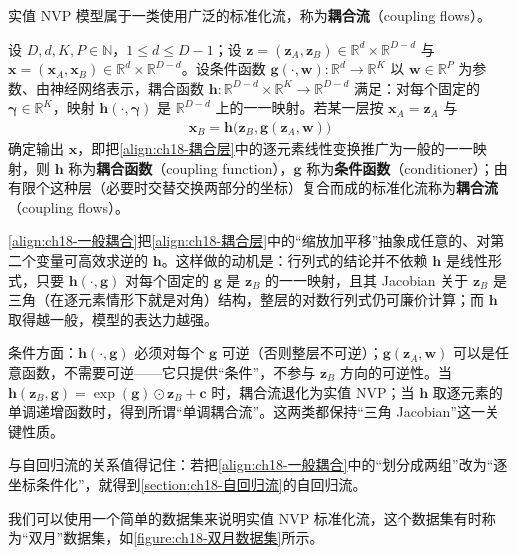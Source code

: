 \documentclass[../../main.tex]{subfiles}
\begin{document}
实值 NVP 模型属于一类使用广泛的标准化流，称为\textbf{耦合流}（coupling flows）。

\begin{definition}[耦合流]\label{definition:ch18-耦合流}
设 $D,d,K,P\in\mathbb{N}$，$1\leqslant d\leqslant D-1$；设 $\bm{z}=(\bm{z}_A,\bm{z}_B)\in\mathbb{R}^{d}\times\mathbb{R}^{D-d}$ 与 $\bm{x}=(\bm{x}_A,\bm{x}_B)\in\mathbb{R}^{d}\times\mathbb{R}^{D-d}$。设条件函数 $\bm{g}(\cdot,\bm{w}):\mathbb{R}^{d}\to\mathbb{R}^{K}$ 以 $\bm{w}\in\mathbb{R}^{P}$ 为参数、由神经网络表示，耦合函数 $\bm{h}:\mathbb{R}^{D-d}\times\mathbb{R}^{K}\to\mathbb{R}^{D-d}$ 满足：对每个固定的 $\bm{\gamma}\in\mathbb{R}^{K}$，映射 $\bm{h}(\cdot,\bm{\gamma})$ 是 $\mathbb{R}^{D-d}$ 上的一一映射。若某一层按 $\bm{x}_A=\bm{z}_A$ 与
\begin{align}
  \bm{x}_B=\bm{h}\big(\bm{z}_B,\bm{g}(\bm{z}_A,\bm{w})\big)\label{align:ch18-一般耦合}
\end{align}
确定输出 $\bm{x}$，即把\eqref{align:ch18-耦合层}中的逐元素线性变换推广为一般的一一映射，则 $\bm{h}$ 称为\textbf{耦合函数}（coupling function），$\bm{g}$ 称为\textbf{条件函数}（conditioner）；由有限个这种层（必要时交替交换两部分的坐标）复合而成的标准化流称为\textbf{耦合流}（coupling flows）。
\end{definition}

\begin{remark}
\eqref{align:ch18-一般耦合}把\eqref{align:ch18-耦合层}中的“缩放加平移”抽象成任意的、对第二个变量可高效求逆的 $\bm{h}$。这样做的动机是：行列式的结论并不依赖 $\bm{h}$ 是线性形式，只要 $\bm{h}(\cdot,\bm{g})$ 对每个固定的 $\bm{g}$ 是 $\bm{z}_B$ 的一一映射，且其 Jacobian 关于 $\bm{z}_B$ 是三角（在逐元素情形下就是对角）结构，整层的对数行列式仍可廉价计算；而 $\bm{h}$ 取得越一般，模型的表达力越强。

条件方面：$\bm{h}(\cdot,\bm{g})$ 必须对每个 $\bm{g}$ 可逆（否则整层不可逆）；$\bm{g}(\bm{z}_A,\bm{w})$ 可以是任意函数，不需要可逆——它只提供“条件”，不参与 $\bm{z}_B$ 方向的可逆性。当 $\bm{h}(\bm{z}_B,\bm{g})=\exp(\bm{g})\odot\bm{z}_B+\bm{c}$ 时，耦合流退化为实值 NVP；当 $\bm{h}$ 取逐元素的单调递增函数时，得到所谓“单调耦合流”。这两类都保持“三角 Jacobian”这一关键性质。

与自回归流的关系值得记住：若把\eqref{align:ch18-一般耦合}中的“划分成两组”改为“逐坐标条件化”，就得到\cref{section:ch18-自回归流}的自回归流。
\end{remark}

我们可以使用一个简单的数据集来说明实值 NVP 标准化流，这个数据集有时称为“双月”数据集，如\cref{figure:ch18-双月数据集}所示。
\end{document}
